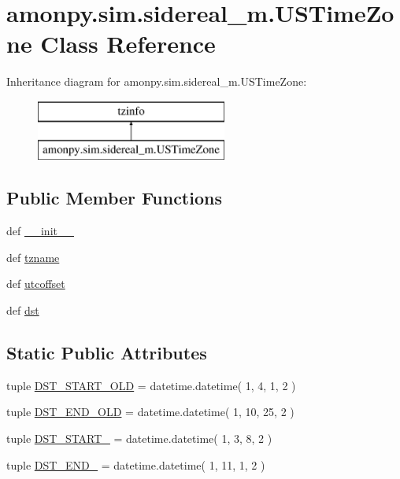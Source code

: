 \hypertarget{classamonpy_1_1sim_1_1sidereal__m_1_1_u_s_time_zone}{\section{amonpy.\-sim.\-sidereal\-\_\-m.\-U\-S\-Time\-Zone Class Reference}
\label{classamonpy_1_1sim_1_1sidereal__m_1_1_u_s_time_zone}
}
Inheritance diagram for amonpy.\-sim.\-sidereal\-\_\-m.\-U\-S\-Time\-Zone\-:\begin{figure}[H]
\begin{center}
\leavevmode
\includegraphics[height=2.000000cm]{classamonpy_1_1sim_1_1sidereal__m_1_1_u_s_time_zone}
\end{center}
\end{figure}
\subsection*{Public Member Functions}
\begin{DoxyCompactItemize}
\item 
def \hyperlink{classamonpy_1_1sim_1_1sidereal__m_1_1_u_s_time_zone_a657f7d4310310a11181f37c0dd88d836}{\-\_\-\-\_\-init\-\_\-\-\_\-}
\item 
def \hyperlink{classamonpy_1_1sim_1_1sidereal__m_1_1_u_s_time_zone_a23cff28f7e915cbedd135a6532801355}{tzname}
\item 
def \hyperlink{classamonpy_1_1sim_1_1sidereal__m_1_1_u_s_time_zone_a34b5a8e398a9fe241a92566fa1c0563b}{utcoffset}
\item 
def \hyperlink{classamonpy_1_1sim_1_1sidereal__m_1_1_u_s_time_zone_ae41bd74cd959a63c935a76f5d7f38f9c}{dst}
\end{DoxyCompactItemize}
\subsection*{Static Public Attributes}
\begin{DoxyCompactItemize}
\item 
tuple \hyperlink{classamonpy_1_1sim_1_1sidereal__m_1_1_u_s_time_zone_a6a44aff78ec6d41c874c5a47faad7bbe}{D\-S\-T\-\_\-\-S\-T\-A\-R\-T\-\_\-\-O\-L\-D} = datetime.\-datetime( 1, 4, 1, 2 )
\item 
tuple \hyperlink{classamonpy_1_1sim_1_1sidereal__m_1_1_u_s_time_zone_a6b3c892f985cb258686c386b1f2adee1}{D\-S\-T\-\_\-\-E\-N\-D\-\_\-\-O\-L\-D} = datetime.\-datetime( 1, 10, 25, 2 )
\item 
tuple \hyperlink{classamonpy_1_1sim_1_1sidereal__m_1_1_u_s_time_zone_a175d1e09720df8704393ae8c0a8c4bbd}{D\-S\-T\-\_\-\-S\-T\-A\-R\-T\-\_} = datetime.\-datetime( 1, 3, 8, 2 )
\item 
tuple \hyperlink{classamonpy_1_1sim_1_1sidereal__m_1_1_u_s_time_zone_a3aebe85ce10342323455d00f174ec2e5}{D\-S\-T\-\_\-\-E\-N\-D\-\_} = datetime.\-datetime( 1, 11, 1, 2 )
\end{DoxyCompactItemize}


